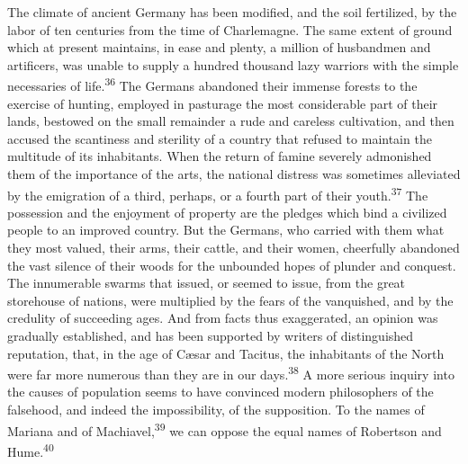 The climate of ancient Germany has been modified, and the soil
fertilized, by the labor of ten centuries from the time of
Charlemagne. The same extent of ground which at present
maintains, in ease and plenty, a million of husbandmen and
artificers, was unable to supply a hundred thousand lazy warriors
with the simple necessaries of life.\textsuperscript{36} The Germans abandoned
their immense forests to the exercise of hunting, employed in
pasturage the most considerable part of their lands, bestowed on
the small remainder a rude and careless cultivation, and then
accused the scantiness and sterility of a country that refused to
maintain the multitude of its inhabitants. When the return of
famine severely admonished them of the importance of the arts,
the national distress was sometimes alleviated by the emigration
of a third, perhaps, or a fourth part of their youth.\textsuperscript{37} The
possession and the enjoyment of property are the pledges which
bind a civilized people to an improved country. But the Germans,
who carried with them what they most valued, their arms, their
cattle, and their women, cheerfully abandoned the vast silence of
their woods for the unbounded hopes of plunder and conquest. The
innumerable swarms that issued, or seemed to issue, from the
great storehouse of nations, were multiplied by the fears of the
vanquished, and by the credulity of succeeding ages. And from
facts thus exaggerated, an opinion was gradually established, and
has been supported by writers of distinguished reputation, that,
in the age of Cæsar and Tacitus, the inhabitants of the North
were far more numerous than they are in our days.\textsuperscript{38} A more
serious inquiry into the causes of population seems to have
convinced modern philosophers of the falsehood, and indeed the
impossibility, of the supposition. To the names of Mariana and of
Machiavel,\textsuperscript{39} we can oppose the equal names of Robertson and
Hume.\textsuperscript{40}



